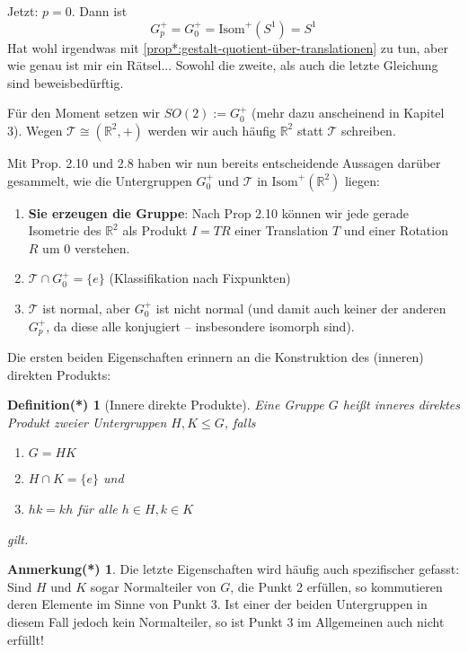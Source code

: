 \documentclass[a4paper, ngerman]{article}
\newcounter{chapter}
\numberwithin{equation}{chapter}
\theoremstyle{plain}
\newtheorem{definitionstrd}{Definition(*)}[chapter]
\theoremstyle{definition}
\newtheorem{annotationstrd}{Anmerkung(*)}[chapter]
\newcommand{\geradisometr}{\ensuremath{\mathrm{Isom}^+(\mathbb R^2)}}
\newcommand{\anm}[1]{{\color{red} #1}}
\begin{document}
Jetzt: \(p=0\). Dann ist 
\begin{equation*}
    G_p^+ = G_0^+ = \mathrm{Isom}^+(S^1) = S^1
\end{equation*}
\anm{Hat wohl irgendwas mit \cref{prop*:gestalt-quotient-über-translationen} zu tun, aber wie genau ist mir ein Rätsel... Sowohl die zweite, als auch die letzte Gleichung sind beweisbedürftig.}

Für den Moment setzen wir \(SO(2):= G_0^+\) (mehr dazu anscheinend in Kapitel 3). Wegen \(\mathcal T \cong (\mathbb R^2, +)\) werden wir auch häufig \(\mathbb R^2\) statt \(\mathcal T\) schreiben. 

Mit Prop. 2.10 und 2.8 haben wir nun bereits entscheidende Aussagen darüber gesammelt, wie die Untergruppen \(G_0^+\) und \(\mathcal T\) in \(\geradisometr\) liegen: 
\begin{enumerate}
    \item \textbf{Sie erzeugen die Gruppe}: Nach Prop 2.10 können wir jede gerade Isometrie des \(\mathbb R^2\) als Produkt \(I=TR\) einer Translation \(T\) und einer Rotation \(R\) um \(0\) verstehen. 
    \item \(\mathcal T \cap G_0^+ = \{e\}\) (Klassifikation nach Fixpunkten) %
    \item \(\mathcal T\) ist normal, aber \(G_0^+\) ist nicht normal (und damit auch keiner der anderen \(G_p^+\), da diese alle konjugiert -- insbesondere isomorph sind). %
\end{enumerate}
Die ersten beiden Eigenschaften erinnern an die Konstruktion des (inneren) direkten Produkts: 
\begin{definitionstrd}[Innere direkte Produkte]\label{def*:innere-direkte-produkte}
    Eine Gruppe \(G\) heißt \emph{inneres direktes Produkt} zweier Untergruppen \(H,K \leq G\), falls 
    \begin{enumerate}
        \item \(G = HK\)
        \item \(H \cap K = \{e\}\) und 
        \item \(hk = kh\) für alle \(h\in H, k \in K\)
    \end{enumerate}
    gilt. 
\end{definitionstrd}
\begin{annotationstrd}\label{ann*:innere-direkte-produkte-über-normalteiler}
    Die letzte Eigenschaften wird häufig auch spezifischer gefasst: Sind \(H\) und \(K\) sogar Normalteiler von \(G\), die Punkt 2 erfüllen, so kommutieren deren Elemente im Sinne von Punkt 3. Ist einer der beiden Untergruppen in diesem Fall jedoch kein Normalteiler, so ist Punkt 3 im Allgemeinen auch nicht erfüllt!
\end{annotationstrd}
\end{document}
